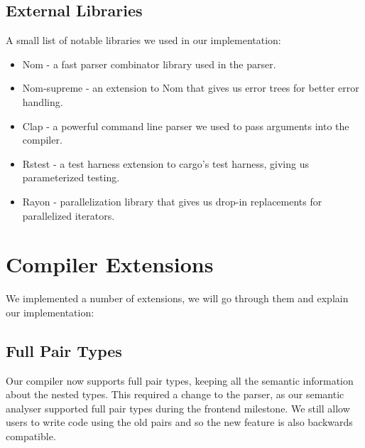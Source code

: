\documentclass{article}
\begin{document}
        \subsection*{External Libraries}
        A small list of notable libraries we used in our implementation:
        \begin{itemize}
            \item Nom - a fast parser combinator library used in the parser.
            \item Nom-supreme - an extension to Nom that gives us error trees for better error handling.
            \item Clap - a powerful command line parser we used to pass arguments into the compiler.
            \item Rstest - a test harness extension to cargo's test harness, giving us parameterized testing.
            \item Rayon - parallelization library that gives us drop-in replacements for parallelized iterators.
        \end{itemize}
        
        
        


    \section*{Compiler Extensions}
        
        We implemented a number of extensions, we will go through them and explain our implementation:
        \subsection*{Full Pair Types}
        Our compiler now supports full pair types, keeping all the semantic information about the nested types. This required a change to the parser, as our semantic analyser supported full pair types during the frontend milestone. We still allow users to write code using the old pairs and so the new feature is also backwards compatible.
\end{document}
